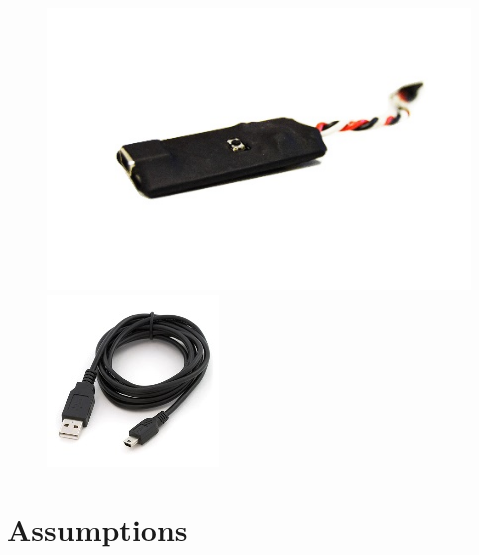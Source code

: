 \documentclass[english]{article}
\begin{document}
\begin{figure}[!h]
	\centering
	\includegraphics{Parts1.jpg}
	\includegraphics{Parts 2 Cable.jpg}
\end{figure}

\section{Assumptions}
\end{document}
